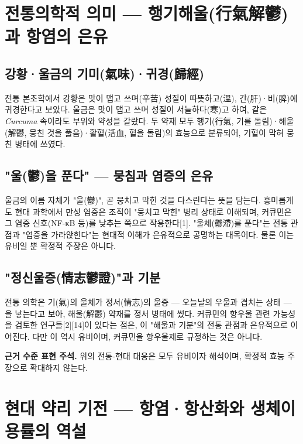\documentclass[12pt,oneside]{book}
\newenvironment{authnote}
  {\par\smallskip\begingroup\leftskip=6mm\rightskip=3mm\small\color{muted}\noindent\ignorespaces}
  {\par\endgroup\smallskip}
\begin{document}
\section{전통의학적 의미 — 행기해울(行氣解鬱)과 항염의 은유}

\subsection{강황·울금의 기미(氣味)·귀경(歸經)}

전통 본초학에서 강황은 맛이 맵고 쓰며(辛苦) 성질이 따뜻하고(溫), 간(肝)·비(脾)에 귀경한다고 보았다. 울금은 맛이 맵고 쓰며 성질이 서늘하다(寒)고 하여, 같은 \textit{Curcuma} 속이라도 부위와 약성을 갈랐다. 두 약재 모두 행기(行氣, 기를 돌림)·해울(解鬱, 뭉친 것을 풀음)·활혈(活血, 혈을 돌림)의 효능으로 분류되어, 기혈이 막혀 뭉친 병태에 쓰였다.

\subsection{"울(鬱)을 푼다" — 뭉침과 염증의 은유}

울금의 이름 자체가 "울(鬱)", 곧 뭉치고 막힌 것을 다스린다는 뜻을 담는다. 흥미롭게도 현대 과학에서 만성 염증은 조직이 "뭉치고 막힌" 병리 상태로 이해되며, 커큐민은 그 염증 신호(NF-κB 등)를 낮추는 쪽으로 작용한다[1]. "울체(鬱滯)를 푼다"는 전통 관점과 "염증을 가라앉힌다"는 현대적 이해가 은유적으로 공명하는 대목이다. 물론 이는 유비일 뿐 확정적 주장은 아니다.

\subsection{"정신울증(情志鬱證)"과 기분}

전통 의학은 기(氣)의 울체가 정서(情志)의 울증 — 오늘날의 우울과 겹치는 상태 — 을 낳는다고 보아, 해울(解鬱) 약재를 정서 병태에 썼다. 커큐민의 항우울 관련 가능성을 검토한 연구들[2][14]이 있다는 점은, 이 "해울과 기분"의 전통 관점과 은유적으로 이어진다. 다만 이 역시 유비이며, 커큐민을 항우울제로 규정하는 것은 아니다.

\begin{authnote}\textbf{근거 수준 표현 주석.} 위의 전통-현대 대응은 모두 유비이자 해석이며, 확정적 효능 주장으로 확대하지 않는다.\end{authnote}

\section{현대 약리 기전 — 항염·항산화와 생체이용률의 역설}
\end{document}
